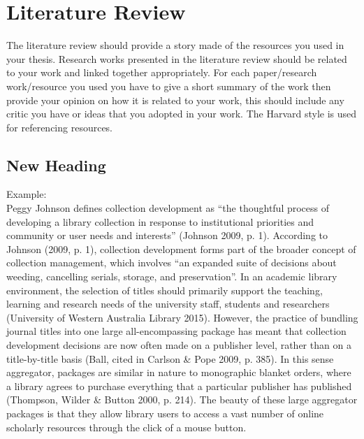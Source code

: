 \chapter{Literature Review}

\begin{justify}
The literature review should provide a story made of the resources you used in your thesis. Research works presented in the literature review should be related to your work and linked together appropriately.  For each paper/research work/resource you used you have to give a short summary of the work then provide your opinion on how it is related to your work, this should include any critic you have or ideas that you adopted in your work.  The Harvard style is used for referencing resources.
\end{justify}

\section{New Heading}
\begin{justify}
Example: \\
Peggy Johnson defines collection development as “the thoughtful process of developing a library collection in response to institutional priorities and community or user needs and interests” (Johnson 2009, p. 1).  According to Johnson (2009, p. 1), collection development forms part of the broader concept of collection management, which involves “an expanded suite of decisions about weeding, cancelling serials, storage, and preservation”.  In an academic library environment, the selection of titles should primarily support the teaching, learning and research needs of the university staff, students and researchers (University of Western Australia Library 2015).  However, the practice of bundling journal titles into one large all-encompassing package has meant that collection development decisions are now often made on a publisher level, rather than on a title-by-title basis (Ball, cited in Carlson \& Pope 2009, p. 385).  In this sense aggregator, packages are similar in nature to monographic blanket orders, where a library agrees to purchase everything that a particular publisher has published (Thompson, Wilder \& Button 2000, p. 214).  The beauty of these large aggregator packages is that they allow library users to access a vast number of online scholarly resources through the click of a mouse button.
\end{justify}

\clearpage